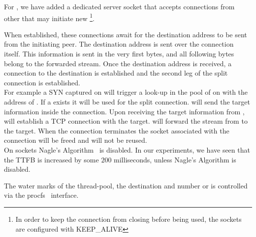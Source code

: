 For \reconn, we have added a dedicated server socket that accepts connections from other \relays that may initiate new \reconn \footnote{In order to keep the connection from closing before being used, the sockets are configured with KEEP\_ALIVE}.

When established, these connections await for the destination address to be sent from the initiating peer. The destination address is sent over the connection itself. This information is sent in the very first bytes, and all following bytes belong to the forwarded stream. 
Once the destination address is received, a connection to the destination is established and the second leg of the split connection is established.\\ 
For example a SYN captured on \rc will trigger a look-up in the pool of \reconn on \rc with the address of \rs. If a \reconn exists it will be used for the split connection. \rc will send the target information inside the connection. Upon receiving the target information from \rc, \rs will establish a TCP connection with the target. \rs will forward the stream from \rc to the target. When the connection terminates the socket associated with the connection will be freed and will not be reused.\\ 
 On \reconn sockets Nagle's Algorithm~\cite{nagle} is disabled. In our experiments, we have seen that the TTFB is increased by some $200$ milliseconds, unless Nagle's Algorithm is disabled.  

 The water marks of the thread-pool, the destination and number or \reconn is controlled via the procfs~\cite{proc} interface.


